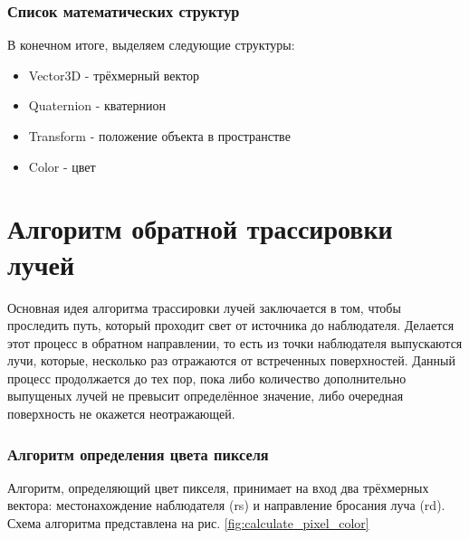 \documentclass[a4paper, 14pt]{report} %
\begin{document}
	\subsubsection{Список математических структур}
	В конечном итоге, выделяем следующие структуры:
	\begin{itemize}
		\item Vector3D - трёхмерный вектор
		\item Quaternion - кватернион
		\item Transform - положение объекта в пространстве
		\item Color - цвет
	\end{itemize}
	
	\section{Алгоритм обратной трассировки лучей}
	Основная идея алгоритма трассировки лучей заключается в том, чтобы проследить путь, который проходит свет от источника до наблюдателя. Делается этот процесс в обратном направлении, то есть из точки наблюдателя выпускаются лучи, которые, несколько раз отражаются от встреченных поверхностей. Данный процесс продолжается до тех пор, пока либо количество дополнительно выпущеных лучей не превысит определённое значение, либо очередная поверхность не окажется неотражающей.
	
	\subsubsection{Алгоритм определения цвета пикселя}
	Алгоритм, определяющий цвет пикселя, принимает на вход два трёхмерных вектора: местонахождение наблюдателя (rs) и направление бросания луча (rd). Схема алгоритма представлена на рис. \ref{fig:calculate_pixel_color}
	
\end{document}
